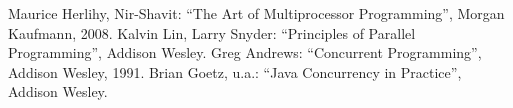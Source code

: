 \documentclass[a4paper]{scrreprt}
\begin{document}
\tableofcontents








\begin{thebibliography}{x}
Maurice Herlihy, Nir-Shavit: "`The Art of Multiprocessor Programming"', Morgan Kaufmann, 2008.
Kalvin Lin, Larry Snyder: "`Principles of Parallel Programming"', Addison Wesley.
Greg Andrews: "`Concurrent Programming"', Addison Wesley, 1991.
Brian Goetz, u.a.: "`Java Concurrency in Practice"', Addison Wesley.
\end{thebibliography}
\end{document}
